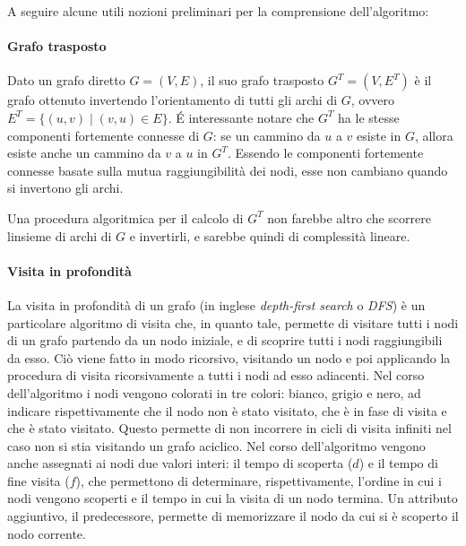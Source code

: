 A seguire alcune utili nozioni preliminari per la comprensione dell'algoritmo:

\paragraph{Grafo trasposto}
Dato un grafo diretto $G = (V, E)$, il suo grafo trasposto $G^T = (V, E^T)$ \`e il grafo ottenuto invertendo
l'orientamento di tutti gli archi di $G$, ovvero $E^T = \{(u, v) \mid (v, u) \in E\}$.
 \'E interessante notare che $G^T$ ha le stesse componenti fortemente connesse di $G$: se un cammino da $u$ a $v$
esiste in $G$, allora esiste anche un cammino da $v$ a $u$ in $G^T$.
Essendo le componenti fortemente connesse basate sulla mutua raggiungibilit\`a dei nodi, esse non cambiano
quando si invertono gli archi.

Una procedura algoritmica per il calcolo di $G^T$ non farebbe altro che scorrere linsieme di archi di $G$ e
invertirli, e sarebbe quindi di complessit\`a lineare.

\paragraph{Visita in profondit\`a}
La visita in profondit\`a di un grafo (in inglese \textit{depth-first search} o \textit{DFS}) \`e un particolare
algoritmo di visita che, in quanto tale, permette di visitare tutti i nodi di un grafo partendo da un nodo iniziale,
e di scoprire tutti i nodi raggiungibili da esso.
Ci\`o viene fatto in modo ricorsivo, visitando un nodo e poi applicando la procedura di visita ricorsivamente
a tutti i nodi ad esso adiacenti.
Nel corso dell'algoritmo i nodi vengono colorati in tre colori: bianco, grigio e nero, ad indicare rispettivamente
che il nodo non \`e stato visitato, che \`e in fase di visita e che \`e stato visitato.
Questo permette di non incorrere in cicli di visita infiniti nel caso non si stia visitando un grafo aciclico.
Nel corso dell'algoritmo vengono anche assegnati ai nodi due valori interi: il tempo di scoperta ($d$) e il tempo di
fine visita ($f$), che permettono di determinare, rispettivamente, l'ordine in cui i nodi vengono scoperti e il tempo
in cui la visita di un nodo termina.
Un attributo aggiuntivo, il predecessore, permette di memorizzare il nodo da cui si \`e scoperto il nodo corrente.

